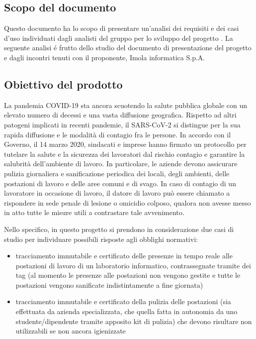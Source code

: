 \subsection{Scopo del documento}
Questo documento ha lo scopo di presentare un'analisi dei requisiti e dei casi d'uso individuati dagli analisti del gruppo \Gruppo{} per lo sviluppo del progetto \emph{\NomeProgetto}. La seguente analisi \'{e} frutto dello studio del documento di presentazione del progetto e dagli incontri tenuti con il proponente, Imola informatica S.p.A.

\subsection{Obiettivo del prodotto}
La pandemia COVID-19 sta ancora scuotendo la salute pubblica globale con un elevato numero di decessi e
una vasta diffusione geografica. Rispetto ad altri patogeni implicati in recenti pandemie, il SARS-CoV-2 si
distingue per la sua rapida diffusione e le modalità di contagio fra le persone.
In accordo con il Governo, il 14 marzo 2020, sindacati e imprese hanno firmato un protocollo per tutelare la
salute e la sicurezza dei lavoratori dal rischio contagio e garantire la salubrità dell’ambiente di lavoro. In
particolare, le aziende devono assicurare pulizia giornaliera e sanificazione periodica dei locali, degli
ambienti, delle postazioni di lavoro e delle aree comuni e di svago. In caso di contagio di un lavoratore in
occasione di lavoro, il datore di lavoro può essere chiamato a rispondere in sede penale di lesione o omicidio colposo, qualora non avesse messo in atto tutte le misure utili a contrastare tale
avvenimento.

Nello specifico, in questo progetto si prendono in considerazione due casi di studio per individuare possibili
risposte agli obblighi normativi:
\begin{itemize}
    \item tracciamento immutabile e certificato delle presenze in tempo reale alle postazioni di lavoro di un
    laboratorio informatico, contrassegnate tramite dei tag  (al momento le presenze alle postazioni
    non vengono gestite e tutte le postazioni vengono sanificate indistintamente a fine giornata)
    \item tracciamento immutabile e certificato della pulizia delle postazioni (sia effettuata da azienda
    specializzata, che quella fatta in autonomia da uno studente/dipendente tramite apposito kit di
    pulizia) che devono risultare non utilizzabili se non ancora igienizzate
\end{itemize}

